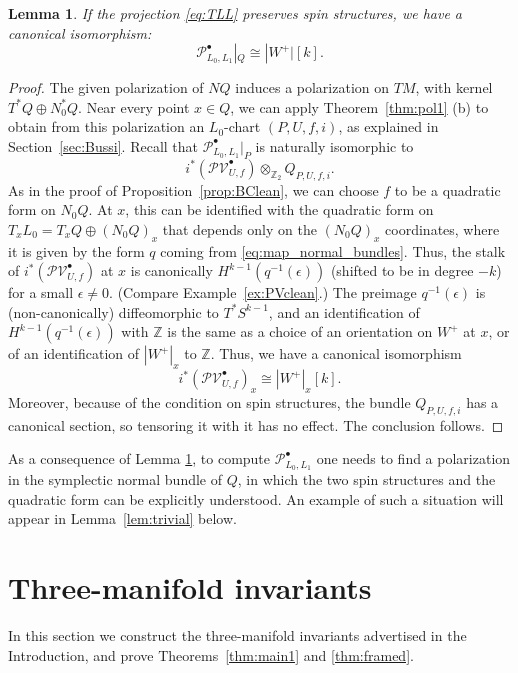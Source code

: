 \documentclass [11pt]{amsart}
\newtheorem {lemma}[theorem]{Lemma}
\theoremstyle{remark}
\def\zz {{\mathbb{Z}}}
\def\Z {\zz}
\def\Pb {\mathcal{P}^\bullet}
\def\PVb {\mathcal{PV}^\bullet}
\begin{document}
\begin{lemma} \label{lem:vanish-cycl-desc-1}
If the projection \eqref{eq:TLL} preserves spin structures, we have a canonical isomorphism:
\begin{equation} \label{eq:compute_local_system_perverse}
 \Pb_{L_0,L_1}|_{Q}  \cong |W^{+}| [k].
\end{equation}
\end{lemma}
\begin{proof}
The given polarization of $NQ$ induces a polarization on $TM$, with kernel $T^*Q \oplus N_0^*Q$. Near every point $x \in Q$, we can apply Theorem~\ref{thm:pol1} (b) to obtain from this polarization an $L_0$-chart $(P, U, f, i)$, as explained in Section~\ref{sec:Bussi}. Recall that $ \Pb_{L_0,L_1}|_P$ is naturally isomorphic to
$$ i^*(\PVb_{U,f}) \otimes_{\Z_2} Q_{P, U, f, i}.$$
As in the proof of Proposition~\ref{prop:BClean}, we can choose $f$ to be a quadratic form on $N_0Q$. At $x$, this can be identified with the quadratic form on $T_xL_0 = T_xQ \oplus (N_0Q)_x$ that depends only on the $(N_0Q)_x$ coordinates, where it is given by the form $q$ coming from  \eqref{eq:map_normal_bundles}. Thus, the stalk of $i^*(\PVb_{U,f})$ at $x$ is canonically $H^{k-1}(q^{-1}(\epsilon))$ (shifted to be in degree $-k$) for a small $\epsilon \neq 0$. (Compare Example~\ref{ex:PVclean}.) The preimage $q^{-1}(\epsilon)$ is (non-canonically) diffeomorphic to $T^*S^{k-1}$, and an identification of $H^{k-1}(q^{-1}(\epsilon))$ with $\Z$ is the same as a choice of an orientation on $W^+$ at $x$, or of an identification of $|W^+|_x$ to $\Z$. Thus, we have a canonical isomorphism
$$i^*(\PVb_{U,f})_x \cong  |W^{+}|_x [k].$$
Moreover, because of the condition on spin structures, the bundle $Q_{P, U, f, i}$ has a canonical section, so tensoring it with it has no effect. The conclusion follows. 
\end{proof}

As a consequence of Lemma \ref{lem:vanish-cycl-desc-1}, to compute $\Pb_{L_0,L_1}$ one needs to find a polarization in the symplectic normal bundle of $Q$, in which the two spin structures and the quadratic form can be explicitly understood. An example of such a situation will appear in Lemma~\ref{lem:trivial} below.

\section{Three-manifold invariants}
\label{sec:Invariant}

In this section we construct the three-manifold invariants advertised in the Introduction, and prove Theorems~\ref{thm:main1} and \ref{thm:framed}.
\end{document}
